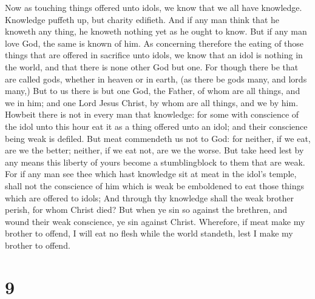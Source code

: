  Now as touching things offered unto idols, we know that we
all have knowledge. Knowledge puffeth up, but charity edifieth.
 And if any man think that he knoweth any thing, he knoweth
nothing yet as he ought to know.  But if any man love God,
the same is known of him.  As concerning therefore the
eating of those things that are offered in sacrifice unto idols, we know
that an idol is nothing in the world, and that there is none other God
but one.  For though there be that are called gods, whether
in heaven or in earth, (as there be gods many, and lords many,)
 But to us there is but one God, the Father, of whom are all
things, and we in him; and one Lord Jesus Christ, by whom are all
things, and we by him.  Howbeit there is not in every man
that knowledge: for some with conscience of the idol unto this hour eat
it as a thing offered unto an idol; and their conscience being weak is
defiled.  But meat commendeth us not to God: for neither, if
we eat, are we the better; neither, if we eat not, are we the worse.
 But take heed lest by any means this liberty of yours
become a stumblingblock to them that are weak.  For if any
man see thee which hast knowledge sit at meat in the idol's temple,
shall not the conscience of him which is weak be emboldened to eat those
things which are offered to idols;  And through thy
knowledge shall the weak brother perish, for whom Christ died?
 But when ye sin so against the brethren, and wound their
weak conscience, ye sin against Christ.  Wherefore, if meat
make my brother to offend, I will eat no flesh while the world standeth,
lest I make my brother to offend.

\hypertarget{section-8}{%
\section{9}\label{section-8}}

